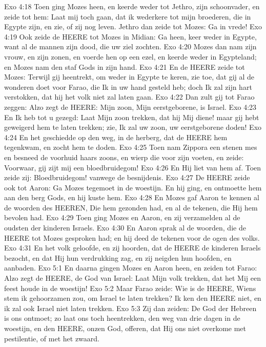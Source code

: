 Exo 4:18  Toen ging Mozes heen, en keerde weder tot Jethro, zijn schoonvader, en zeide tot hem: Laat mij toch gaan, dat ik wederkere tot mijn broederen, die in Egypte zijn, en zie, of zij nog leven. Jethro dan zeide tot Mozes: Ga in vrede!
Exo 4:19  Ook zeide de HEERE tot Mozes in Midian: Ga heen, keer weder in Egypte, want al de mannen zijn dood, die uw ziel zochten.
Exo 4:20  Mozes dan nam zijn vrouw, en zijn zonen, en voerde hen op een ezel, en keerde weder in Egypteland; en Mozes nam den staf Gods in zijn hand.
Exo 4:21  En de HEERE zeide tot Mozes: Terwijl gij heentrekt, om weder in Egypte te keren, zie toe, dat gij al de wonderen doet voor Farao, die Ik in uw hand gesteld heb; doch Ik zal zijn hart verstokken, dat hij het volk niet zal laten gaan.
Exo 4:22  Dan zult gij tot Farao zeggen: Alzo zegt de HEERE: Mijn zoon, Mijn eerstgeborene, is Israel.
Exo 4:23  En Ik heb tot u gezegd: Laat Mijn zoon trekken, dat hij Mij diene! maar gij hebt geweigerd hem te laten trekken; zie, Ik zal uw zoon, uw eerstgeborene doden!
Exo 4:24  En het geschiedde op den weg, in de herberg, dat de HEERE hem tegenkwam, en zocht hem te doden.
Exo 4:25  Toen nam Zippora een stenen mes en besneed de voorhuid haars zoons, en wierp die voor zijn voeten, en zeide: Voorwaar, gij zijt mij een bloedbruidegom!
Exo 4:26  En Hij liet van hem af. Toen zeide zij: Bloedbruidegom! vanwege de besnijdenis.
Exo 4:27  De HEERE zeide ook tot Aaron: Ga Mozes tegemoet in de woestijn. En hij ging, en ontmoette hem aan den berg Gods, en hij kuste hem.
Exo 4:28  En Mozes gaf Aaron te kennen al de woorden des HEEREN, Die hem gezonden had, en al de tekenen, die Hij hem bevolen had.
Exo 4:29  Toen ging Mozes en Aaron, en zij verzamelden al de oudsten der kinderen Israels.
Exo 4:30  En Aaron sprak al de woorden, die de HEERE tot Mozes gesproken had; en hij deed de tekenen voor de ogen des volks.
Exo 4:31  En het volk geloofde, en zij hoorden, dat de HEERE de kinderen Israels bezocht, en dat Hij hun verdrukking zag, en zij neigden hun hoofden, en aanbaden.
Exo 5:1  En daarna gingen Mozes en Aaron heen, en zeiden tot Farao: Alzo zegt de HEERE, de God van Israel: Laat Mijn volk trekken, dat het Mij een feest houde in de woestijn!
Exo 5:2  Maar Farao zeide: Wie is de HEERE, Wiens stem ik gehoorzamen zou, om Israel te laten trekken? Ik ken den HEERE niet, en ik zal ook Israel niet laten trekken.
Exo 5:3  Zij dan zeiden: De God der Hebreen is ons ontmoet; zo laat ons toch heentrekken, den weg van drie dagen in de woestijn, en den HEERE, onzen God, offeren, dat Hij ons niet overkome met pestilentie, of met het zwaard.
